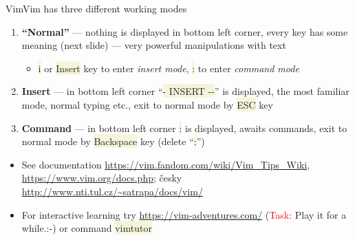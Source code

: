 \documentclass[compress, xelatex, 11pt, xcolor=svgnames, aspectratio=169,
	hyperref={
		bookmarks=true,
		unicode=true,
		colorlinks=true,
		pdftitle={Linux, command line and MetaCentrum},
		plainpages=false,
		pdfauthor={Vojtech Zeisek},
		pdfsubject={Course about use of Linux command line, writing shell scripts and using MetaCentrum of CESNET},
		pdfcreator={XeLaTeX},
		pdfkeywords={Linux, GNU, BASH, shell, command line, MetaCentrum},
		linkcolor=DarkRed, %
		anchorcolor=DarkBlue, %
		citecolor=Indigo, %
		filecolor=NavyBlue, %
		menucolor=DarkMagenta, %
		urlcolor=DarkBlue, %
		},
	url={hyphens, lowtilde} %
	]{beamer}
\renewcommand{\texttt}[1]{\colorbox{Beige}{{\ttfamily #1}}}
\renewcommand{\alert}[1]{\textcolor{red}{#1}}
\begin{document}
\begin{frame}{Vim}{Vim has three different working modes}
	\label{vim}
	\begin{enumerate}
		\item \textbf{\enquote{Normal}} --- nothing is displayed in bottom left corner, every key has some meaning (next slide) --- very powerful manipulations with text
		\begin{itemize}
			\item \texttt{i} or \texttt{Insert} key to enter \textit{insert mode}, \texttt{:} to enter \textit{command mode}
		\end{itemize}
		\item \textbf{Insert} --- in bottom left corner \enquote{\texttt{{-}- INSERT -{-}}} is displayed, the most familiar mode, normal typing etc., exit to normal mode by \texttt{ESC} key
		\item \textbf{Command} --- in bottom left corner \texttt{:} is displayed, awaits commands, exit to normal mode by \texttt{Backspace} key (delete \enquote{\texttt{:}})
	\end{enumerate}
	\begin{itemize}
		\item See documentation \url{https://vim.fandom.com/wiki/Vim_Tips_Wiki}, \url{https://www.vim.org/docs.php}; česky \url{http://www.nti.tul.cz/~satrapa/docs/vim/}
		\item For interactive learning try \url{https://vim-adventures.com/} (\alert{Task:} Play it for a while.:-) or command \texttt{vimtutor}
	\end{itemize}
\end{frame}
\end{document}
